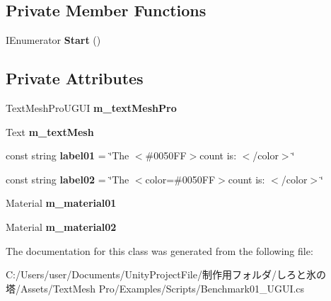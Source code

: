 \subsection*{Private Member Functions}
\begin{DoxyCompactItemize}
\item 
\mbox{\label{class_t_m_pro_1_1_examples_1_1_benchmark01___u_g_u_i_a72bbcf307e7a9a4fb28edf0e4865b619}} 
I\+Enumerator {\bfseries Start} ()
\end{DoxyCompactItemize}
\subsection*{Private Attributes}
\begin{DoxyCompactItemize}
\item 
\mbox{\label{class_t_m_pro_1_1_examples_1_1_benchmark01___u_g_u_i_a138cb98358634c40efb0e35e4b8d2da0}} 
Text\+Mesh\+Pro\+U\+G\+UI {\bfseries m\+\_\+text\+Mesh\+Pro}
\item 
\mbox{\label{class_t_m_pro_1_1_examples_1_1_benchmark01___u_g_u_i_a9eb879cfb947c40a33a8a7f5bbf18661}} 
Text {\bfseries m\+\_\+text\+Mesh}
\item 
\mbox{\label{class_t_m_pro_1_1_examples_1_1_benchmark01___u_g_u_i_a8bba7d6079aca832612a80f4ae68b2db}} 
const string {\bfseries label01} = \char`\"{}The $<$\#0050\+F\+F$>$count is\+: $<$/color$>$\char`\"{}
\item 
\mbox{\label{class_t_m_pro_1_1_examples_1_1_benchmark01___u_g_u_i_abfd96548cfc3d7a5c2bed80aa4f4a00f}} 
const string {\bfseries label02} = \char`\"{}The $<$color=\#0050\+F\+F$>$count is\+: $<$/color$>$\char`\"{}
\item 
\mbox{\label{class_t_m_pro_1_1_examples_1_1_benchmark01___u_g_u_i_a27552373f2d542929f2ab2b92e09db80}} 
Material {\bfseries m\+\_\+material01}
\item 
\mbox{\label{class_t_m_pro_1_1_examples_1_1_benchmark01___u_g_u_i_a95ca6bf5a7d5f8cd4eeef51bdbf0e864}} 
Material {\bfseries m\+\_\+material02}
\end{DoxyCompactItemize}


The documentation for this class was generated from the following file\+:\begin{DoxyCompactItemize}
\item 
C\+:/\+Users/user/\+Documents/\+Unity\+Project\+File/制作用フォルダ/しろと氷の塔/\+Assets/\+Text\+Mesh Pro/\+Examples/\+Scripts/Benchmark01\+\_\+\+U\+G\+U\+I.\+cs\end{DoxyCompactItemize}
